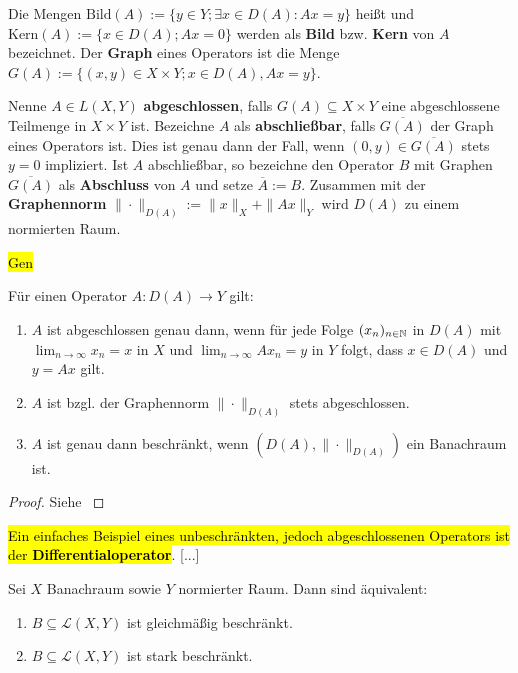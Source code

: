 \par
Die Mengen  $\text{Bild}(A):= \{y\in Y; \exists x\in D(A): Ax = y\}$ heißt und $\text{Kern}(A):=\{x\in D(A); Ax=0\}$ werden als \index{}\textbf{Bild} bzw. \textbf{Kern} von $A$ bezeichnet. Der \textbf{Graph} eines Operators ist die Menge $G(A):=\{(x,y)\in X\times Y; x\in D(A), Ax= y\}$.  
\par
Nenne $A\in  L(X, Y)$ \textbf{abgeschlossen}, falls $G(A)\subseteq X\times Y$ eine abgeschlossene Teilmenge in $X\times Y$ ist. Bezeichne $A$ als \label{Operator!abschließbar}\textbf{abschließbar}, falls $\overline{G(A)}$ der Graph eines Operators ist. Dies ist genau dann der Fall, wenn $(0,y)\in\overline{G(A)}$ stets $y=0$ impliziert. Ist $A$ abschließbar, so bezeichne den Operator $B$ mit Graphen $\overline {G(A)}$ als \textbf{Abschluss} von $A$ und setze $\overline A:=B$. Zusammen mit der \textbf{Graphennorm}  $\|\cdot\|_{D(A)}:=\|x\|_X + \|Ax\|_Y$ wird $D(A)$ zu einem normierten Raum.
\par
\hl{Gen}

\par
[...]

\begin{bem} Für einen Operator  $A\colon D(A)\to Y$ gilt:
\begin{enumerate}
\item $A$ ist abgeschlossen genau dann, wenn für jede Folge $(x_n)_{n\in\mathbb{N}}$ in $D(A)$ mit $\lim_{n\to\infty} x_n = x$ in $X$ und $\lim_{n\to\infty} Ax_n = y$ in $Y$ folgt, dass  $x\in D(A)$ und $y= Ax$ gilt. 
\item $A$ ist bzgl. der Graphennorm $\|\cdot\|_{D(A)}$ stets abgeschlossen.
\item $A$ ist genau dann beschränkt, wenn $(D(A), \|\cdot\|_{D(A)})$ ein Banachraum ist.
\end{enumerate}
\end{bem}

\begin{proof}
Siehe \cite{}
\end{proof}


\begin{bsp}
\hl{Ein einfaches Beispiel eines unbeschränkten, jedoch abgeschlossenen Operators ist der \textbf{Differentialoperator}}. [...]
\end{bsp}

\begin{fsatz}
Sei $X$ Banachraum sowie $Y$ normierter Raum. Dann sind äquivalent:
\begin{enumerate}
\item $B\subseteq \mathcal L(X,Y)$ ist gleichmäßig beschränkt.
\item $B\subseteq \mathcal L(X,Y)$ ist stark beschränkt.
\end{enumerate}
\end{fsatz}

